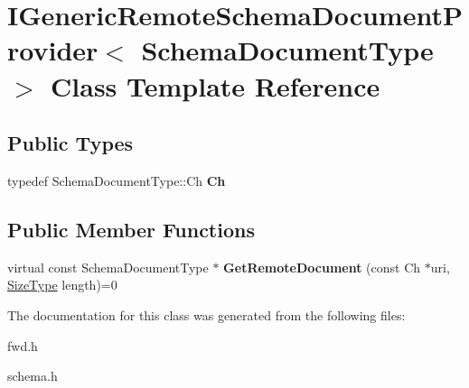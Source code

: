 \hypertarget{a02236}{}\section{I\+Generic\+Remote\+Schema\+Document\+Provider$<$ Schema\+Document\+Type $>$ Class Template Reference}
\label{a02236}
\subsection*{Public Types}
\begin{DoxyCompactItemize}
\item 
\mbox{\label{a02236_acfcd5492c3df8ff56cd2d84d36cc0ceb}} 
typedef Schema\+Document\+Type\+::\+Ch {\bfseries Ch}
\end{DoxyCompactItemize}
\subsection*{Public Member Functions}
\begin{DoxyCompactItemize}
\item 
\mbox{\label{a02236_aad112a069dd57fe850fafd04cbb4777b}} 
virtual const Schema\+Document\+Type $\ast$ {\bfseries Get\+Remote\+Document} (const Ch $\ast$uri, \hyperlink{a00560_a5ed6e6e67250fadbd041127e6386dcb5}{Size\+Type} length)=0
\end{DoxyCompactItemize}


The documentation for this class was generated from the following files\+:\begin{DoxyCompactItemize}
\item 
fwd.\+h\item 
schema.\+h\end{DoxyCompactItemize}
